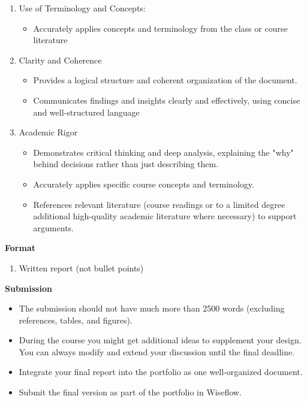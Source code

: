 \documentclass[10pt]{article}
\begin{document}
\begin{enumerate}
\begin{itemize}
        course.
        \item Goes beyond simple explanations of threats to discuss how the proposed design
        mitigates these specific threats (or acknowledges which threats remain unavoidable).
    \end{itemize}
    \item Use of Terminology and Concepts:
    \begin{itemize}
        \item Accurately applies concepts and terminology from the class or course literature
    \end{itemize}
    \item Clarity and Coherence
    \begin{itemize}
        \item Provides a logical structure and coherent organization of the document.
        \item Communicates findings and insights clearly and effectively, using concise and well-structured language
    \end{itemize}
    \item Academic Rigor
    \begin{itemize}
        \item Demonstrates critical thinking and deep analysis, explaining the "why" behind decisions
        rather than just describing them.
        \item Accurately applies specific course concepts and terminology.
        \item References relevant literature (course readings or to a limited degree additional high-quality academic literature where necessary) to support arguments.
    \end{itemize}
\end{enumerate}
\textbf{Format}
\begin{enumerate}
    \item Written report (not bullet points)
\end{enumerate}
\textbf{Submission}
\begin{itemize}
    \item The submission should not have much more than 2500 words (excluding references,
    tables, and figures).
    \item During the course you might get additional ideas to supplement your design. You can
    always modify and extend your discussion until the final deadline.
    \item Integrate your final report into the portfolio as one well-organized document.
    \item Submit the final version as part of the portfolio in Wiseflow.
\end{itemize}
\end{document}
